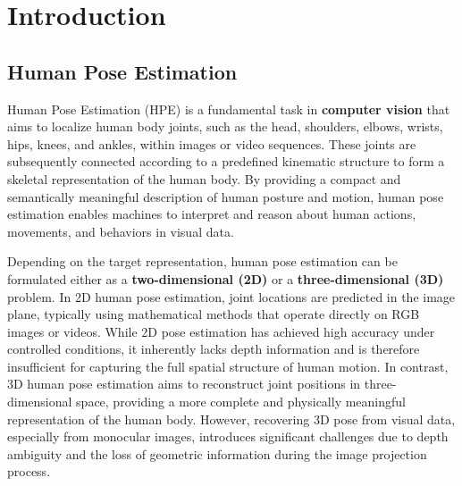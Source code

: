 \chapter{Introduction}

\section{Human Pose Estimation}

Human Pose Estimation (HPE) is a fundamental task in \textbf{computer vision} that aims to localize human body joints, such as the head, shoulders, elbows, wrists, hips, knees, and ankles, within images or video sequences. 
These joints are subsequently connected according to a predefined kinematic structure to form a skeletal representation of the human body. 
By providing a compact and semantically meaningful description of human posture and motion, human pose estimation enables machines to interpret and reason about human actions, movements, and behaviors in visual data.

Depending on the target representation, human pose estimation can be formulated either as a \textbf{two-dimensional (2D)} or a \textbf{three-dimensional (3D)} problem.
In 2D human pose estimation, joint locations are predicted in the image plane, typically using mathematical methods that operate directly on RGB images or videos. 
While 2D pose estimation has achieved high accuracy under controlled conditions, it inherently lacks depth information and is therefore insufficient for capturing the full spatial structure of human motion.
In contrast, 3D human pose estimation aims to reconstruct joint positions in three-dimensional space, providing a more complete and physically meaningful representation of the human body.
However, recovering 3D pose from visual data, especially from monocular images, introduces significant challenges due to depth ambiguity and the loss of geometric information during the image projection process.

